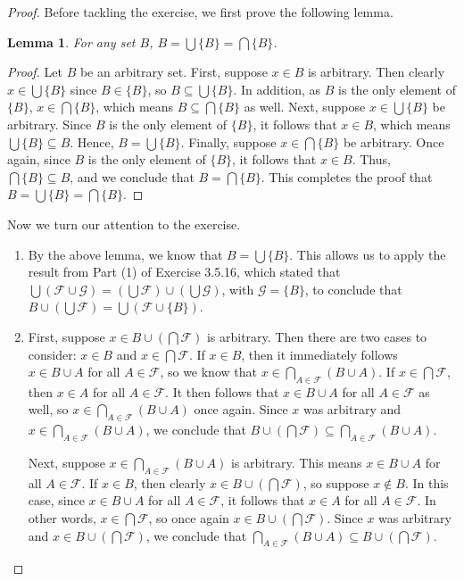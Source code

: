 \documentclass[12pt]{amsart}
\newtheorem{lemma}[theorem]{Lemma}
\theoremstyle{definition}
\theoremstyle{remark}
\begin{document}
\begin{proof}
Before tackling the exercise, we first prove the following lemma.
\begin{lemma}
	For any set $B$, $B = \bigcup \{ B \} = \bigcap \{ B \}$.
\end{lemma}
\begin{proof}
	Let $B$ be an arbitrary set.
	First, suppose $x \in B$ is arbitrary.
	Then clearly $x \in \bigcup \{ B \}$ since $B \in \{ B \}$, so $B \subseteq \bigcup \{ B \}$.
	In addition, as $B$ is the only element of $\{ B \}$, $x \in \bigcap \{ B \}$, which means
	$B \subseteq \bigcap \{ B \}$ as well.
	Next, suppose $x \in \bigcup \{ B \}$ be arbitrary.
	Since $B$ is the only element of $\{ B \}$, it follows that $x \in B$, which means
	$\bigcup \{ B \} \subseteq B$.
	Hence, $B = \bigcup \{ B \}$.
	Finally, suppose $x \in \bigcap \{ B \}$ be arbitrary.
	Once again, since $B$ is the only element of $\{ B \}$, it follows that $x \in B$.
	Thus, $\bigcap \{ B \} \subseteq B$, and we conclude that $B = \bigcap \{ B \}$.
	This completes the proof that $B = \bigcup \{ B \} = \bigcap \{ B \}$.
\end{proof}
Now we turn our attention to the exercise.
\begin{enumerate}
	\item By the above lemma, we know that $B = \bigcup \{ B \}$.
	This allows us to apply the result from Part (1) of Exercise 3.5.16, which stated that
	$\bigcup (\mathcal{F} \cup \mathcal{G}) =
	\left( \bigcup \mathcal{F} \right) \cup \left( \bigcup \mathcal{G} \right)$, with 
	$\mathcal{G} = \{ B \}$, to conclude that $B \cup \left( \bigcup \mathcal{F} \right) = 
	\bigcup (\mathcal{F} \cup \{ B \})$.
	
	\item First, suppose $x \in B \cup \left( \bigcap \mathcal{F} \right)$ is arbitrary.
	Then there are two cases to consider: $x \in B$ and $x \in \bigcap \mathcal{F}$.
	If $x \in B$, then it immediately follows $x \in B \cup A$ for all $A \in \mathcal{F}$,
	so we know that $x \in \bigcap_{A \in \mathcal{F}} (B \cup A)$.
	If $x \in \bigcap \mathcal{F}$, then $x \in A$ for all $A \in \mathcal{F}$.
	It then follows that $x \in B \cup A$ for all $A \in \mathcal{F}$ as well,
	so $x \in \bigcap_{A \in \mathcal{F}} (B \cup A)$ once again.
	Since $x$ was arbitrary and $x \in \bigcap_{A \in \mathcal{F}} (B \cup A)$, we conclude that
	$B \cup \left( \bigcap \mathcal{F} \right) \subseteq \bigcap_{A \in \mathcal{F}} (B \cup A)$.
	
	Next, suppose $x \in \bigcap_{A \in \mathcal{F}} (B \cup A)$ is arbitrary.
	This means $x \in B \cup A$ for all $A \in \mathcal{F}$.
	If $x \in B$, then clearly $x \in B \cup \left( \bigcap \mathcal{F} \right)$, so suppose $x \notin B$.
	In this case, since $x \in B \cup A$ for all $A \in \mathcal{F}$,
	it follows that $x \in A$ for all $A \in \mathcal{F}$.
	In other words, $x \in \bigcap \mathcal{F}$, so once again 
	$x \in B \cup \left( \bigcap \mathcal{F} \right)$.
	Since $x$ was arbitrary and $x \in B \cup \left( \bigcap \mathcal{F} \right)$, we conclude that
	$\bigcap_{A \in \mathcal{F}} (B \cup A) \subseteq B \cup \left( \bigcap \mathcal{F} \right)$.
	

\end{enumerate}
\end{proof}
\end{document}
